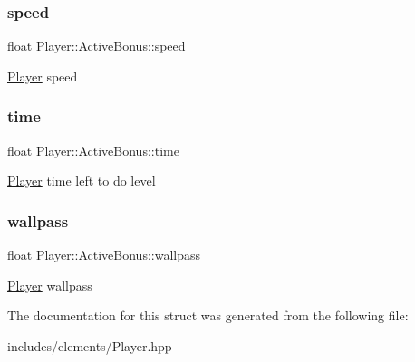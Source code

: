 \subsubsection{\texorpdfstring{speed}{speed}}
{\footnotesize\ttfamily float Player\+::\+Active\+Bonus\+::speed}

\hyperlink{class_player}{Player} speed \mbox{\label{struct_player_1_1_active_bonus_a4d5933b2c052d233a8ee9934577f6fdd}} 
\subsubsection{\texorpdfstring{time}{time}}
{\footnotesize\ttfamily float Player\+::\+Active\+Bonus\+::time}

\hyperlink{class_player}{Player} time left to do level \mbox{\label{struct_player_1_1_active_bonus_af5a24d36905852ddac53dfea2712e81d}} 
\subsubsection{\texorpdfstring{wallpass}{wallpass}}
{\footnotesize\ttfamily float Player\+::\+Active\+Bonus\+::wallpass}

\hyperlink{class_player}{Player} wallpass 

The documentation for this struct was generated from the following file\+:\begin{DoxyCompactItemize}
\item 
includes/elements/Player.\+hpp\end{DoxyCompactItemize}
